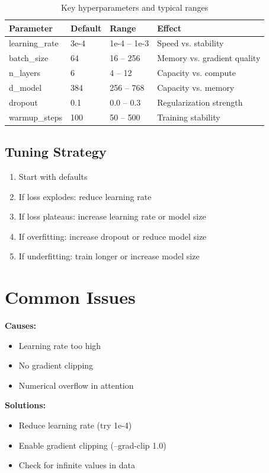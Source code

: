 \begin{table}[H]
\centering
\begin{tabular}{llll}
\toprule
\textbf{Parameter} & \textbf{Default} & \textbf{Range} & \textbf{Effect} \\
\midrule
learning\_rate & 3e-4 & 1e-4 -- 1e-3 & Speed vs. stability \\
batch\_size & 64 & 16 -- 256 & Memory vs. gradient quality \\
n\_layers & 6 & 4 -- 12 & Capacity vs. compute \\
d\_model & 384 & 256 -- 768 & Capacity vs. memory \\
dropout & 0.1 & 0.0 -- 0.3 & Regularization strength \\
warmup\_steps & 100 & 50 -- 500 & Training stability \\
\bottomrule
\end{tabular}
\caption{Key hyperparameters and typical ranges}
\end{table}

\subsection{Tuning Strategy}

\begin{enumerate}
    \item Start with defaults
    \item If loss explodes: reduce learning rate
    \item If loss plateaus: increase learning rate or model size
    \item If overfitting: increase dropout or reduce model size
    \item If underfitting: train longer or increase model size
\end{enumerate}

\section{Common Issues}

\begin{pitfall}[title=Loss is NaN]
\textbf{Causes:}
\begin{itemize}
    \item Learning rate too high
    \item No gradient clipping
    \item Numerical overflow in attention
\end{itemize}
\textbf{Solutions:}
\begin{itemize}
    \item Reduce learning rate (try 1e-4)
    \item Enable gradient clipping (--grad-clip 1.0)
    \item Check for infinite values in data
\end{itemize}
\end{pitfall}

